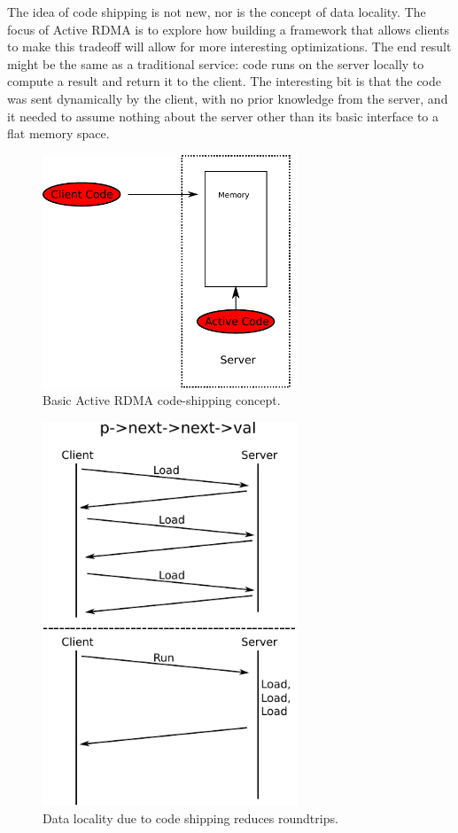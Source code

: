 \documentclass[10pt]{article}
\begin{document}
The idea of code shipping is not new, nor is the concept of data
locality. The focus of Active RDMA is to explore how building a
framework that allows clients to make this tradeoff will allow for
more interesting optimizations. The end result might be the same as a
traditional service: code runs on the server locally to compute a
result and return it to the client. The interesting bit is that the
code was sent dynamically by the client, with no prior knowledge from
the server, and it needed to assume nothing about the server other
than its basic interface to a flat memory space.

\begin{figure}
\centering
\includegraphics[width=3in]{fig/fig1.pdf}
\caption{Basic Active RDMA code-shipping concept.}
\label{fig:fig1}
\end{figure}

\begin{figure}
\centering
\includegraphics[width=3in]{fig/fig2.pdf}
\caption{Data locality due to code shipping reduces roundtrips.}
\label{fig:fig2}
\end{figure}
\end{document}
